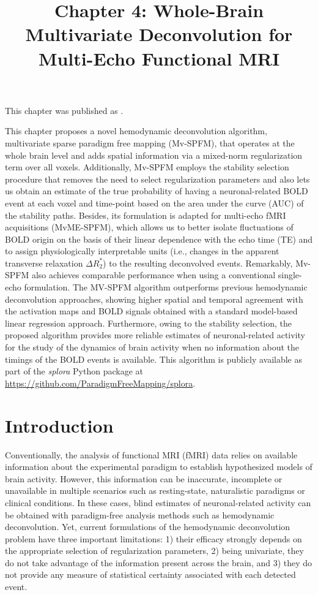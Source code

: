 \title{Chapter 4: Whole-Brain Multivariate Deconvolution for Multi-Echo Functional MRI}
\label{cha:multivariate}

This chapter was published as \cite{Urunuela2022Wholebrainmultivariate}.

This chapter proposes a novel hemodynamic deconvolution algorithm, multivariate
sparse paradigm free mapping (Mv-SPFM), that operates at the whole brain level
and adds spatial information via a mixed-norm regularization term over all
voxels. Additionally, Mv-SPFM employs the stability selection
procedure that removes the need to select regularization parameters and also
lets us obtain an estimate of the true probability of having a neuronal-related
BOLD event at each voxel and time-point based on the area under the curve (AUC)
of the stability paths. Besides, its formulation is adapted for multi-echo fMRI
acquisitions (MvME-SPFM), which allows us to better isolate fluctuations of BOLD
origin on the basis of their linear dependence with the echo time (TE) and to
assign physiologically interpretable units (i.e., changes in the apparent
transverse relaxation $\Delta R_2^*$) to the resulting deconvolved events.
Remarkably, Mv-SPFM also achieves comparable performance when using a
conventional single-echo formulation. The MV-SPFM algorithm outperforms previous
hemodynamic deconvolution approaches, showing higher spatial and temporal
agreement with the activation maps and BOLD signals obtained with a standard
model-based linear regression approach. Furthermore, owing to the stability
selection, the proposed algorithm provides more reliable estimates of
neuronal-related activity for the study of the dynamics of brain activity when
no information about the timings of the BOLD events is available. This algorithm
is publicly available as part of the \textit{splora} Python package at
\url{https://github.com/ParadigmFreeMapping/splora}.

\section{Introduction}
\label{sec:multivariate_introduction}

Conventionally, the analysis of functional MRI (fMRI) data relies on available
information about the experimental paradigm to establish hypothesized models of
brain activity. However, this information can be inaccurate, incomplete or
unavailable in multiple scenarios such as resting-state, naturalistic paradigms
or clinical conditions. In these cases, blind estimates of neuronal-related
activity can be obtained with paradigm-free analysis methods such as hemodynamic
deconvolution. Yet, current formulations of the hemodynamic deconvolution
problem have three important limitations: 1) their efficacy strongly depends on
the appropriate selection of regularization parameters, 2) being univariate,
they do not take advantage of the information present across the brain, and 3)
they do not provide any measure of statistical certainty associated with each
detected event.

